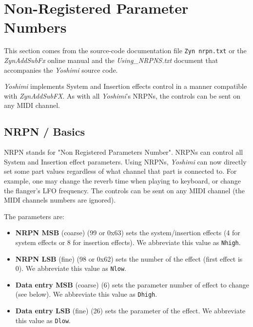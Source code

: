 %
%
%

\section{Non-Registered Parameter Numbers}
\label{sec:nrpns}

   This section comes from the source-code documentation file
   \texttt{Zyn nrpn.txt} or the \textsl{ZynAddSubFx}
   online manual \cite{zyndoc} and the \textsl{Using\_NRPNS.txt} document that
   accompanies the \textsl{Yoshimi} source code.

   \textsl{Yoshimi} implements System and Insertion effects control in a
   manner compatible with \textsl{ZynAddSubFX}. As with all
   \textsl{Yoshimi}'s NRPNs, the controls can be sent on any MIDI channel.

\subsection{NRPN / Basics}
\label{subsection:nrpns_midi_nrpn_basics}

   NRPN stands for "Non Registered Parameters Number".
   NRPNs can control all System and Insertion effect parameters.
   Using NRPNs, \textsl{Yoshimi} can now directly set some part values
   regardless of what channel that part is connected to.  For example, one
   may change the reverb time when playing to keyboard, or
   change the flanger's LFO frequency.
   The controls can be sent on any MIDI channel
   (the MIDI channels numbers are ignored).

   The parameters are:

   \begin{itemize}
      \item \textbf{NRPN MSB}
      (coarse) (99 or 0x63) sets the system/insertion effects
      (4 for system effects or 8 for insertion effects).
      We abbreviate this value as \texttt{Nhigh}.
      \item \textbf{NRPN LSB}
      (fine) (98 or 0x62) sets the number of the effect (first
      effect is 0).
      We abbreviate this value as \texttt{Nlow}.
      \item \textbf{Data entry MSB}
      (coarse) (6) sets the parameter number of effect to
      change (see below).
      We abbreviate this value as \texttt{Dhigh}.
      \item \textbf{Data entry LSB}
      (fine) (26) sets the parameter of the effect.
      We abbreviate this value as \texttt{Dlow}.
   \end{itemize}

